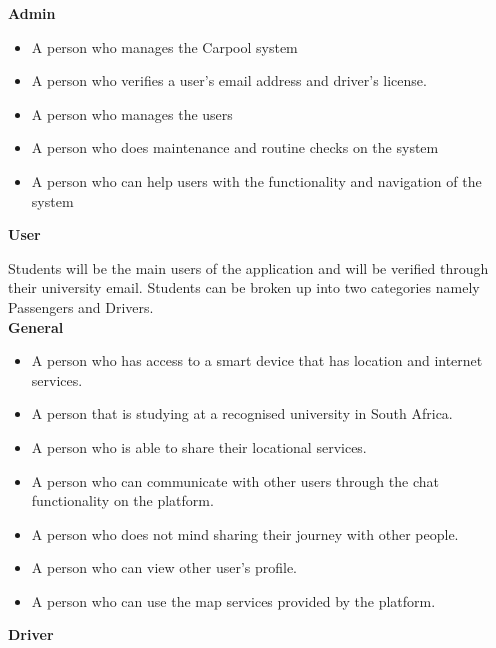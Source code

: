 \documentclass[hidelinks, 12pt, a4paper]{article}
\begin{document}
    \Large{ \textbf{Admin} }
    \normalsize
        \begin{itemize}
            \item A person who manages the Carpool system
            \item A person who verifies a user’s email address and driver’s license.
            \item 	A person who manages the users
            \item 	A person who does maintenance and routine checks on the system
            \item 	A person who can help users with the functionality and navigation of the system

        \end{itemize}
    
    \vspace{0.5cm}
    \Large{\textbf{User}}
    \normalsize
    
    Students will be the main users of the application and will be verified through their university email. Students can be broken up into two categories namely Passengers and Drivers.\\
    
    \large{ \textbf{General} }
    
        \begin{itemize}

            \item A person who has access to a smart device that has location and internet services.
            \item A person that is studying at a recognised university in South Africa.
            \item A person who is able to share their locational services.
            \item A person who can communicate with other users through the chat functionality on the platform.
            \item A person who does not mind sharing their journey with other people.
            \item A person who can view other user's profile.
            \item A person who can use the map services provided by the platform.
        \end{itemize}
        \vspace{5.0cm}
        
    \large{ \textbf{Driver} }
    
\end{document}
